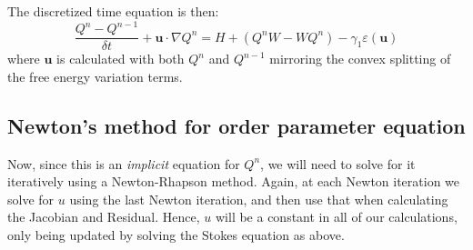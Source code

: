 \documentclass[reqno]{article}
\begin{document}
  The discretized time equation is then:
  \begin{equation}
    \frac{Q^n - Q^{n - 1}}{\delta t}
    + \mathbf{u} \cdot \nabla Q^n
    =
    H
    + \left( Q^n W - W Q^n \right)
    - \gamma_1 \varepsilon(\mathbf{u})
  \end{equation}
  where $\mathbf{u}$ is calculated with both $Q^n$ and $Q^{n - 1}$ mirroring the
  convex splitting of the free energy variation terms.

  \subsection{Newton's method for order parameter equation}
  Now, since this is an \textit{implicit} equation for $Q^n$, we will need to
  solve for it iteratively using a Newton-Rhapson method.
  Again, at each Newton iteration we solve for $u$ using the last Newton
  iteration, and then use that when calculating the Jacobian and Residual.
  Hence, $u$ will be a constant in all of our calculations, only being updated
  by solving the Stokes equation as above.
\end{document}
